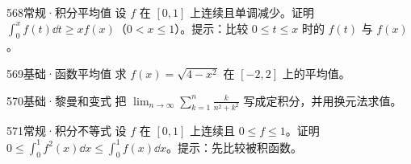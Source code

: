 \begin{exercise}{568}{常规·积分平均值}
设 $f$ 在 $[0,1]$ 上连续且单调减少。证明 $\int_0^xf(t)\dd t\ge xf(x)$（$0<x\le1$）。提示：比较 $0\le t\le x$ 时的 $f(t)$ 与 $f(x)$。
\end{exercise}
\begin{exercise}{569}{基础·函数平均值}
求 $f(x)=\sqrt{4-x^2}$ 在 $[-2,2]$ 上的平均值。
\end{exercise}
\begin{exercise}{570}{基础·黎曼和变式}
把 $\lim_{n\to\infty}\sum_{k=1}^n\frac{k}{n^2+k^2}$ 写成定积分，并用换元法求值。
\end{exercise}
\begin{exercise}{571}{常规·积分不等式}
设 $f$ 在 $[0,1]$ 上连续且 $0\le f\le1$。证明 $0\le\int_0^1f^2(x)\dd x\le\int_0^1f(x)\dd x$。提示：先比较被积函数。
\end{exercise}
